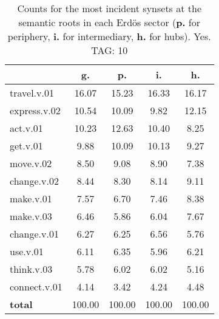 \begin{table}[h!]
\begin{center}
\begin{tabular}{| l | c | c | c | c |}\hline
 & g. & p. & i. & h. \\\hline
travel.v.01 & 16.07  & 15.23  & 16.33  & 16.17 \\\hline
express.v.02 & 10.54  & 10.09  & 9.82  & 12.15 \\\hline
act.v.01 & 10.23  & 12.63  & 10.40  & 8.25 \\\hline
get.v.01 & 9.88  & 10.09  & 10.13  & 9.27 \\\hline
move.v.02 & 8.50  & 9.08  & 8.90  & 7.38 \\\hline
change.v.02 & 8.44  & 8.30  & 8.14  & 9.11 \\\hline
make.v.01 & 7.57  & 6.70  & 7.46  & 8.38 \\\hline
make.v.03 & 6.46  & 5.86  & 6.04  & 7.67 \\\hline
change.v.01 & 6.27  & 6.25  & 6.56  & 5.76 \\\hline
use.v.01 & 6.11  & 6.35  & 5.96  & 6.21 \\\hline
think.v.03 & 5.78  & 6.02  & 6.02  & 5.16 \\\hline
connect.v.01 & 4.14  & 3.42  & 4.24  & 4.48 \\\hline
{{\bf total}} & 100.00  & 100.00  & 100.00  & 100.00 \\\hline
\end{tabular}
\caption{Counts for the most incident synsets at the semantic roots in each Erd\"os sector ({\bf p.} for periphery, {\bf i.} for intermediary, {\bf h.} for hubs). Yes. TAG: 10}
\end{center}
\end{table}